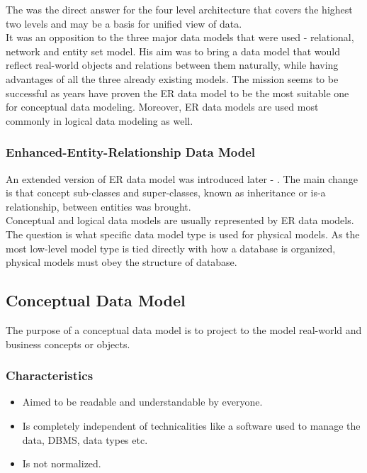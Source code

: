 The  was the direct answer for the four level architecture\cite{Chen76theentity-relationship} that covers the highest two levels and may be a basis for unified view of data. \\
It was an opposition to the three major data models that were used - relational, network and entity set model. His aim was to bring a data model that would reflect real-world objects and relations between them naturally, while having advantages of all the three already existing models. The mission seems to be successful as years have proven the ER data model to be the most suitable one for conceptual data modeling. Moreover, ER data models are used most commonly in logical data modeling as well.

\subsubsection{Enhanced-Entity-Relationship Data Model}

An extended version of ER data model was introduced later - . The main change is that concept sub-classes and super-classes, known as inheritance or is-a relationship, between entities was brought. \\ 

Conceptual and logical data models are usually represented by ER data models. 
The question is what specific data model type is used for physical models. 
As the most low-level model type is tied directly with how a database is organized, physical models must obey the structure of database.

\subsection{Conceptual Data Model}

The purpose of a conceptual data model is to project to the model real-world and business concepts or objects. \\

\subsubsection{Characteristics}
\begin{itemize}
	\item Aimed to be readable and understandable by everyone.
	\item Is completely independent of technicalities like a software used to manage the data, DBMS, data types etc.
	\item Is not normalized.
\end{itemize}

